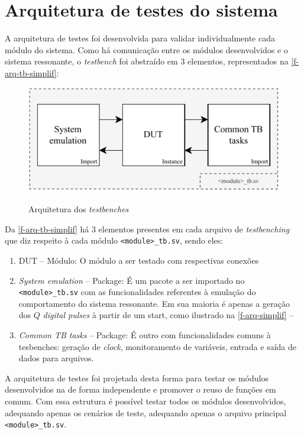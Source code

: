 



\section{Arquitetura de testes do sistema}

A arquitetura de testes foi desenvolvida para validar individualmente cada módulo do sistema. Como há comunicação entre os módulos desenvolvidos e o sistema ressonante, o \textit{testbench} foi abstraído em 3 elementos, representados na \autoref{f-arq-tb-simplif}:

\begin{figure}[H]
    \centering
    \caption{Arquitetura dos \textit{testbenches}}
    \includegraphics[width=.5\textwidth]{fig/simplif-tb-structure.pdf}
    \label{f-arq-tb-simplif}
\end{figure}

Da \autoref{f-arq-tb-simplif} há 3 elementos presentes em cada arquivo de \textit{testbenching} que diz respeito à cada módulo \verb|<module>_tb.sv|, sendo eles:

\begin{enumerate}
    \item DUT -- Módulo: O módulo a ser testado com respectivas conexões
    \item \textit{System emulation} -- Package: É um pacote a ser importado no \verb|<module>_tb.sv| com as funcionalidades referentes à emulação do comportamento do sistema ressonante. Em sua maioria é apenas a geração dos $Q$ \textit{digital pulses} à partir de um start, como ilustrado na \autoref{f-arq-simplif} -- 
    \item \textit{Common TB tasks} -- Package: É outro com funcionalidades comuns à tesbenches: geração de \textit{clock}, monitoramento de variáveis, entrada e saída de dados para arquivos. 
\end{enumerate}

A arquitetura de testes foi projetada desta forma para testar os módulos desenvolvidos na  de forma independente e promover o reuso de funções em comum. Com essa estrutura é possível testar todos os módulos desenvolvidos, adequando apenas os cenários de teste, adequando apenas o arquivo principal \verb|<module>_tb.sv|.


